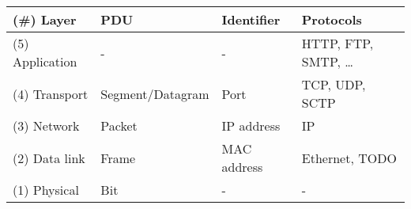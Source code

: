 \begin{tabular}{|l|l|l|l|}
  \hline
  (\#) Layer      & PDU              & Identifier  & Protocols              \\ \hline
  (5) Application & -                & -           & HTTP, FTP, SMTP, \dots \\
  (4) Transport   & Segment/Datagram & Port        & TCP, UDP, SCTP         \\
  (3) Network     & Packet           & IP address  & IP                     \\
  (2) Data link   & Frame            & MAC address & Ethernet, TODO         \\
  (1) Physical    & Bit              & -           & -                      \\ \hline
\end{tabular}
